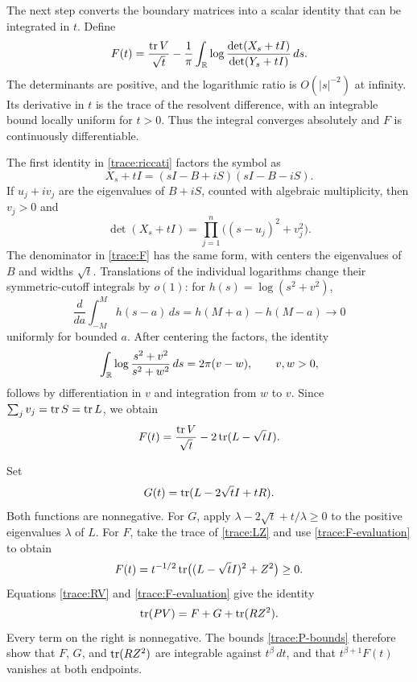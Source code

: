 The next step converts the boundary matrices into a scalar identity
that can be integrated in $t$.  Define
\begin{equation}\label{trace:F}
 F(t)=\frac{\operatorname{tr} V}{\sqrt t}
       -\frac1\pi\int_\mathbb R
          \log\frac{\det(X_s+tI)}{\det(Y_s+tI)}\,ds.
\end{equation}
The determinants are positive, and the logarithmic ratio is
$O(|s|^{-2})$ at infinity.  Its derivative in $t$ is the trace
of the resolvent difference, with an integrable bound locally
uniform for $t>0$.  Thus the integral converges absolutely and
$F$ is continuously differentiable.

The first identity in \eqref{trace:riccati} factors the symbol as
\[
 X_s+tI=(sI-B+iS)(sI-B-iS).
\]
If $u_j+iv_j$ are the eigenvalues of $B+iS$, counted with
algebraic multiplicity, then $v_j>0$ and
\[
 \det(X_s+tI)=\prod_{j=1}^n\bigl((s-u_j)^2+v_j^2\bigr).
\]
The denominator in \eqref{trace:F} has the same form, with centers
the eigenvalues of $B$ and widths $\sqrt t$.
Translations of the individual logarithms change their
symmetric-cutoff integrals by $o(1)$: for
$h(s)=\log(s^2+v^2)$,
\[
 \frac{d}{da}\int_{-M}^M h(s-a)\,ds
       =h(M+a)-h(M-a)\longrightarrow0
\]
uniformly for bounded $a$.  After centering the factors, the identity
\[
 \int_\mathbb R\log\frac{s^2+v^2}{s^2+w^2}\,ds=2\pi(v-w),
 \qquad v,w>0,
\]
follows by differentiation in $v$ and integration from $w$ to $v$.
Since $\sum_jv_j=\operatorname{tr} S=\operatorname{tr} L$, we obtain
\begin{equation}\label{trace:F-evaluation}
 F(t)=\frac{\operatorname{tr} V}{\sqrt t}-2\operatorname{tr}(L-\sqrt t I).
\end{equation}

Set
\begin{equation}\label{trace:G}
 G(t)=\operatorname{tr}(L-2\sqrt t I+tR).
\end{equation}
Both functions are nonnegative.  For $G$, apply
$\lambda-2\sqrt t+t/\lambda\geq0$ to the positive eigenvalues
$\lambda$ of $L$.  For $F$, take the trace of \eqref{trace:LZ}
and use \eqref{trace:F-evaluation} to obtain
\[
 F(t)=t^{-1/2}\operatorname{tr}\bigl((L-\sqrt t I)^2+Z^2\bigr)\geq0.
\]
Equations \eqref{trace:RV} and \eqref{trace:F-evaluation} give
the identity
\begin{equation}\label{trace:FG}
 \operatorname{tr}(PV)=F+G+\operatorname{tr}(RZ^2).
\end{equation}
Every term on the right is nonnegative.  The bounds
\eqref{trace:P-bounds} therefore show that $F$, $G$, and
$\operatorname{tr}(RZ^2)$ are integrable against $t^\beta\,dt$, and that
$t^{\beta+1}F(t)$ vanishes at both endpoints.

